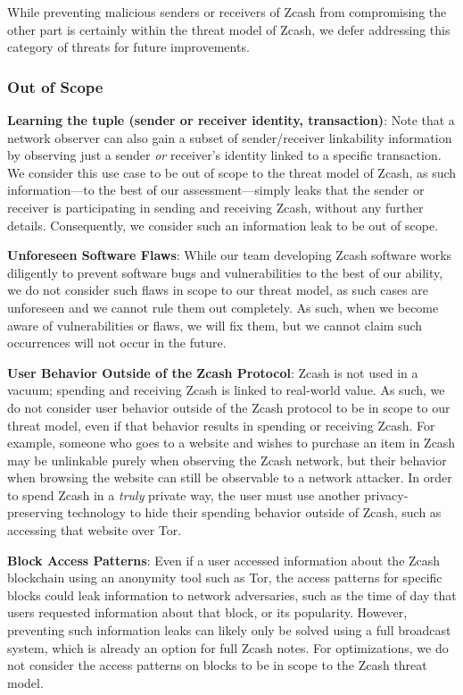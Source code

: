 \documentclass{article}
\begin{document}
While preventing malicious
senders or receivers of Zcash from compromising the other part is certainly
within the threat model of Zcash, we defer addressing this category of threats
for future improvements.

\subsubsection{Out of Scope}
\label{out-of-scope}

\textbf{Learning the tuple (sender or receiver identity, transaction)}:
Note that a network observer can also gain a subset of sender/receiver
linkability information by
observing just a sender \emph{or} receiver's identity linked to a specific
transaction. We consider this use case to be out of scope to the threat model
of Zcash, as such
information---to the best of our assessment---simply leaks that the sender or
receiver is participating in sending and receiving Zcash, without any further
details. Consequently, we consider such an information leak to be out of scope.

\textbf{Unforeseen Software Flaws}: While our team developing Zcash software
works diligently to prevent software bugs and vulnerabilities to the best of
our ability, we do not
consider such flaws in scope to our threat model, as such cases are unforeseen
and we cannot rule them out completely. As such, when we become aware of
vulnerabilities or flaws, we will fix them, but we cannot claim such
occurrences will not occur in the future.

\textbf{User Behavior Outside of the Zcash Protocol}: Zcash is not used in a
vacuum; spending and receiving Zcash is linked to real-world value. As such, we
do not consider user behavior outside of the Zcash protocol to be in scope to
our threat model, even if that behavior results in spending or receiving Zcash.
For example, someone who goes to a website and wishes to purchase an item in
Zcash may be unlinkable purely when observing the Zcash network, but their
behavior when browsing the website can still be observable to a network
attacker. In order to spend Zcash in a \emph{truly} private way, the user must
use another privacy-preserving technology to hide their spending behavior
outside of Zcash, such as accessing that website over Tor.

\textbf{Block Access Patterns}: Even if a user accessed
information about the Zcash blockchain using an anonymity tool such as Tor, the
access patterns for specific blocks could leak information to network
adversaries, such as the time of day that users requested information about
that block, or its popularity. However, preventing such information leaks
can likely only be solved using a full broadcast system, which is already
an option for full Zcash notes. For optimizations, we do not consider the
access patterns on blocks to be in scope to the Zcash threat model.
\end{document}

